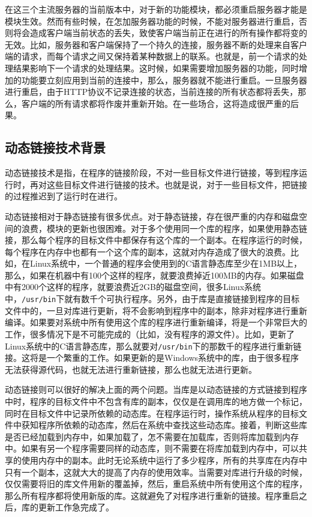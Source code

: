 \documentclass[12pt, twoside, a4paper, xetex]{report}
\begin{document}
	在这三个主流服务器的当前版本中，对于新的功能模块，都必须重启服务器才能是模块生效。然而有些时候，在怎加服务器功能的时候，不能对服务器进行重启，否则将会造成客户端当前状态的丢失，致使客户端当前正在进行的所有操作都将变的无效。比如，服务器和客户端保持了一个持久的连接，服务器不断的处理来自客户端的请求，而每个请求之间又保持着某种数据上的联系。也就是，前一个请求的处理结果影响下一个请求的处理结果。这时候，如果需要增加服务器的功能，同时增加的功能要立刻应用到当前的连接中，那么，服务器就不能进行重启。一旦服务器进行重启，由于HTTP协议不记录连接的状态，当前连接的所有状态都将丢失，那么，客户端的所有请求都将作废并重新开始。在一些场合，这将造成很严重的后果。
	
\subsection{动态链接技术背景}
	动态链接技术是指，在程序的链接阶段，不对一些目标文件进行链接，等到程序运行时，再对这些目标文件进行链接的技术。也就是说，对于一些目标文件，把链接的过程推迟到了运行时在进行。
	
	动态链接相对于静态链接有很多优点。对于静态链接，存在很严重的内存和磁盘空间的浪费，模块的更新也很困难。对于多个使用同一个库的程序，如果使用静态链接，那么每个程序的目标文件中都保存有这个库的一个副本。在程序运行的时候，每个程序在内存中也都有一个这个库的副本，这就对内存造成了很大的浪费。比如，在Linux系统中，一个普通的程序会使用到的C语言静态库至少在1MB以上，那么，如果在机器中有100个这样的程序，就要浪费掉近100MB的内存。如果磁盘中有2000个这样的程序，就要浪费近2GB的磁盘空间，很多Linux系统中，\verb|/usr/bin|下就有数千个可执行程序。另外，由于库是直接链接到程序的目标文件中的，一旦对库进行更新，将不会影响到程序中的副本，除非对程序进行重新编译。如果要对系统中所有使用这个库的程序进行重新编译，将是一个非常巨大的工作，很多情况下是不可能完成的（比如，没有程序的源文件）。比如，更新了Linux系统中的C语言静态库，那么就要对\verb|/usr/bin|下的那数千的程序进行重新链接。这将是一个繁重的工作。如果更新的是Windows系统中的库，由于很多程序无法获得源代码，也就无法进行重新链接，那么也就无法进行更新。
	
	动态链接则可以很好的解决上面的两个问题。当库是以动态链接的方式链接到程序中时，程序的目标文件中不包含有库的副本，仅仅是在调用库的地方做一个标记，同时在目标文件中记录所依赖的动态库。在程序运行时，操作系统从程序的目标文件中获知程序所依赖的动态库，然后在系统中查找这些动态库。接着，判断这些库是否已经加载到内存中，如果加载了，怎不需要在加载库，否则将库加载到内存中。如果有另一个程序需要同样的动态库，则不需要在将库加载到内存中，可以共享的使用内存中的副本。此时无论系统中运行了多少程序，所有的共享库在内存中只有一个副本，这就大大的提高了内存的使用效率。当需要对库进行升级的时候，仅仅需要将旧的库文件用新的覆盖掉，然后，重启系统中所有使用这个库的程序，那么所有程序都将使用新版的库。这就避免了对程序进行重新的链接。程序重启之后，库的更新工作急完成了。
	
\end{document}
